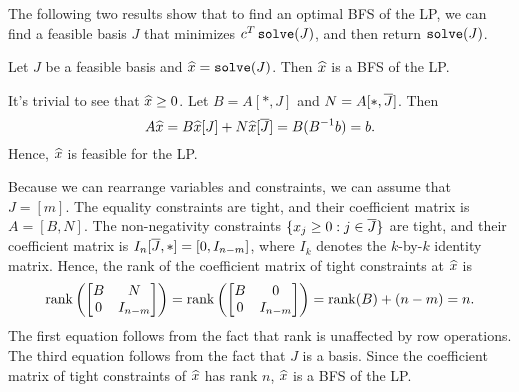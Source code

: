 The following two results show that to find an optimal BFS of the LP,
we can find a feasible basis $J$ that minimizes $c^T\operatorname{\mathtt{solve}}(J)$, and then return $\operatorname{\mathtt{solve}}(J)$.

\begin{lemma}
\label{thm:basis-gives-bfs}
Let $J$ be a feasible basis and $\widehat{x} = \operatorname{\mathtt{solve}}(J)$.
Then $\widehat{x}$ is a BFS of the LP.
\end{lemma}
\begin{longProof}
It's trivial to see that $\widehat{x} \ge 0$. Let $B = A[*,J]$ and $N = A[*,\overline{J}]$. Then
\[ A\widehat{x} = B\widehat{x}[J] + N\widehat{x}[\overline{J}] = B(B^{-1}b) = b. \]
Hence, $\widehat{x}$ is feasible for the LP.

Because we can rearrange variables and constraints, we can assume \wLoG{} that $J = [m]$.
The equality constraints are tight, and their coefficient matrix is $A = [B, N]$.
The non-negativity constraints $\{x_j \ge 0: j \in \overline{J}\}$ are tight,
and their coefficient matrix is $I_n[\overline{J},*] = [0, I_{n-m}]$,
where $I_k$ denotes the $k$-by-$k$ identity matrix.
Hence, the rank of the coefficient matrix of tight constraints at $\widehat{x}$ is
\[ \operatorname{rank}\left(\begin{bmatrix}B & N \\ 0 & I_{n-m}\end{bmatrix}\right)
= \operatorname{rank}\left(\begin{bmatrix}B & 0 \\ 0 & I_{n-m}\end{bmatrix}\right)
= \operatorname{rank}(B) + (n-m) = n. \]
The first equation follows from the fact that rank is unaffected by row operations.
The third equation follows from the fact that $J$ is a basis.
Since the coefficient matrix of tight constraints of $\widehat{x}$ has rank $n$,
$\widehat{x}$ is a BFS of the LP.
\end{longProof}

